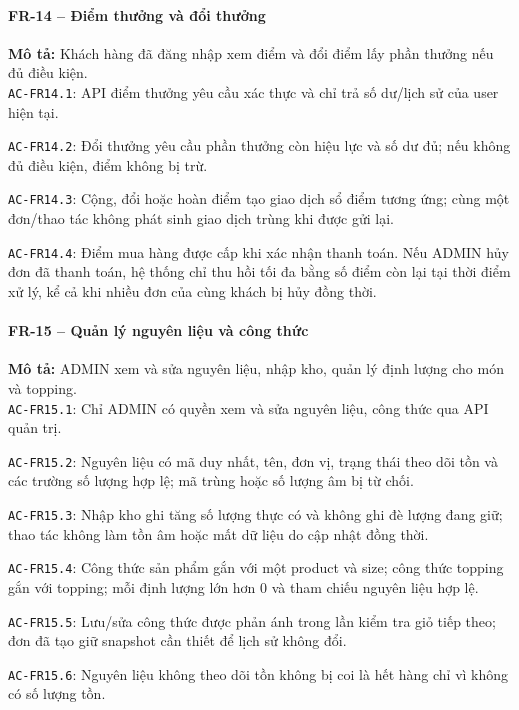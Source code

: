 \paragraph{FR-14 -- Điểm thưởng và đổi thưởng}
\textbf{Mô tả:} Khách hàng đã đăng nhập xem điểm và đổi điểm lấy phần thưởng nếu đủ điều kiện.\\
\noindent\texttt{AC-FR14.1}: API điểm thưởng yêu cầu xác thực và chỉ trả số dư/lịch sử của user hiện tại.\par
\noindent\texttt{AC-FR14.2}: Đổi thưởng yêu cầu phần thưởng còn hiệu lực và số dư đủ; nếu không đủ điều kiện, điểm không bị trừ.\par
\noindent\texttt{AC-FR14.3}: Cộng, đổi hoặc hoàn điểm tạo giao dịch sổ điểm tương ứng; cùng một đơn/thao tác không phát sinh giao dịch trùng khi được gửi lại.\par
\noindent\texttt{AC-FR14.4}: Điểm mua hàng được cấp khi xác nhận thanh toán. Nếu ADMIN hủy đơn đã thanh toán, hệ thống chỉ thu hồi tối đa bằng số điểm còn lại tại thời điểm xử lý, kể cả khi nhiều đơn của cùng khách bị hủy đồng thời.\par

\paragraph{FR-15 -- Quản lý nguyên liệu và công thức}
\textbf{Mô tả:} ADMIN xem và sửa nguyên liệu, nhập kho, quản lý định lượng cho món và topping.\\
\noindent\texttt{AC-FR15.1}: Chỉ ADMIN có quyền xem và sửa nguyên liệu, công thức qua API quản trị.\par
\noindent\texttt{AC-FR15.2}: Nguyên liệu có mã duy nhất, tên, đơn vị, trạng thái theo dõi tồn và các trường số lượng hợp lệ; mã trùng hoặc số lượng âm bị từ chối.\par
\noindent\texttt{AC-FR15.3}: Nhập kho ghi tăng số lượng thực có và không ghi đè lượng đang giữ; thao tác không làm tồn âm hoặc mất dữ liệu do cập nhật đồng thời.\par
\noindent\texttt{AC-FR15.4}: Công thức sản phẩm gắn với một product và size; công thức topping gắn với topping; mỗi định lượng lớn hơn 0 và tham chiếu nguyên liệu hợp lệ.\par
\noindent\texttt{AC-FR15.5}: Lưu/sửa công thức được phản ánh trong lần kiểm tra giỏ tiếp theo; đơn đã tạo giữ snapshot cần thiết để lịch sử không đổi.\par
\noindent\texttt{AC-FR15.6}: Nguyên liệu không theo dõi tồn không bị coi là hết hàng chỉ vì không có số lượng tồn.\par

